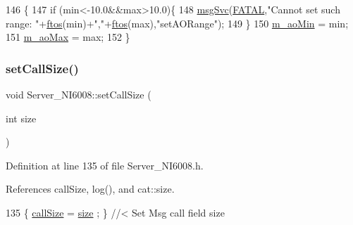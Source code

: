 \begin{DoxyCode}
146                                                \{
147     \textcolor{keywordflow}{if} (min<-10.0&&max>10.0)\{
148     \hyperlink{classServer__NI6008_a140d5f91d6c0f4fb963ecf747e44df78}{msgSvc}(\hyperlink{classServer__NI6008_af1e3e3bac26355a746b5d2e548fe25bea678aa96ea2189f7d6ab602160fa49b8b}{FATAL},\textcolor{stringliteral}{"Cannot set such range: "}+\hyperlink{Server__NI6008_8h_ad2603c89b82a1609399d9c9257f947f7}{ftos}(min)+\textcolor{stringliteral}{","}+\hyperlink{Server__NI6008_8h_ad2603c89b82a1609399d9c9257f947f7}{ftos}(max),\textcolor{stringliteral}{"setAORange"});
149     \}
150     \hyperlink{classServer__NI6008_ad650503ceebacea17688e04065130eaa}{m\_aoMin} = min;
151     \hyperlink{classServer__NI6008_a228a5d51f43daaf9eaea8e77cfa3334e}{m\_aoMax} = max;
152   \}
\end{DoxyCode}
\mbox{\label{classServer__NI6008_ae2eab1871efb0ec0a7c0c72f56604e13}} 
\subsubsection{\texorpdfstring{set\+Call\+Size()}{setCallSize()}}
{\footnotesize\ttfamily void Server\+\_\+\+N\+I6008\+::set\+Call\+Size (\begin{DoxyParamCaption}\item[{int}]{size }\end{DoxyParamCaption})\hspace{0.3cm}{\ttfamily [inline]}}



Definition at line 135 of file Server\+\_\+\+N\+I6008.\+h.



References call\+Size, log(), and cat\+::size.


\begin{DoxyCode}
135 \{ \hyperlink{classServer__NI6008_a9aa5c02fb85f20452a3f8e0f9dcc33fd}{callSize}   = \hyperlink{namespacecat_a3eae50bb86a614752045105e00365a46}{size}  ; \} \textcolor{comment}{//< Set Msg call field size}
\end{DoxyCode}
\mbox{\label{classServer__NI6008_adc52659db137940242998e8e0b980c03}} 
